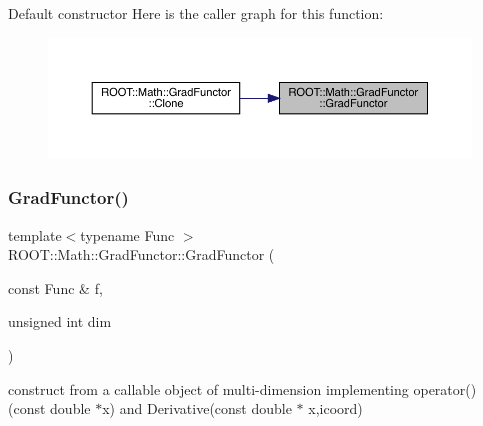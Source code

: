 Default constructor Here is the caller graph for this function\+:\nopagebreak
\begin{figure}[H]
\begin{center}
\leavevmode
\includegraphics[width=350pt]{de/d74/classROOT_1_1Math_1_1GradFunctor_a68c75192981688e292ee84be652a8ec4_icgraph}
\end{center}
\end{figure}
\mbox{\label{classROOT_1_1Math_1_1GradFunctor_a9cdbcd3d49494b4209524b3c5b3172d2}} 
\subsubsection{\texorpdfstring{GradFunctor()}{GradFunctor()}\hspace{0.1cm}{\footnotesize\ttfamily [2/15]}}
{\footnotesize\ttfamily template$<$typename Func $>$ \\
R\+O\+O\+T\+::\+Math\+::\+Grad\+Functor\+::\+Grad\+Functor (\begin{DoxyParamCaption}\item[{const Func \&}]{f,  }\item[{unsigned int}]{dim }\end{DoxyParamCaption})\hspace{0.3cm}{\ttfamily [inline]}}

construct from a callable object of multi-\/dimension implementing operator()(const double $\ast$x) and Derivative(const double $\ast$ x,icoord) \mbox{\label{classROOT_1_1Math_1_1GradFunctor_af7c06950b37bea8844b81f53b0bf41df}} 
